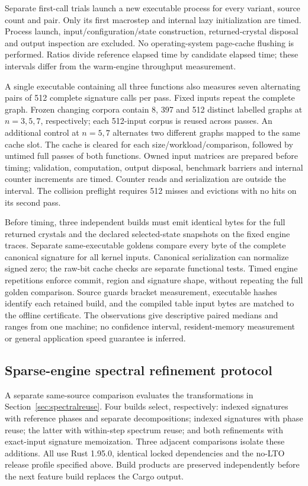 \documentclass[11pt,a4paper]{article}
\theoremstyle{definition}\newtheorem{definition}[theorem]{Definition}
\begin{document}
Separate first-call trials launch a new executable process for every variant, source count and pair. Only its first macrostep and internal lazy initialization are timed. Process launch, input/configuration/state construction, returned-crystal disposal and output inspection are excluded. No operating-system page-cache flushing is performed. Ratios divide reference elapsed time by candidate elapsed time; these intervals differ from the warm-engine throughput measurement.

A single executable containing all three functions also measures seven alternating pairs of 512 complete signature calls per pass. Fixed inputs repeat the complete graph. Frozen changing corpora contain 8, 397 and 512 distinct labelled graphs at $n=3,5,7$, respectively; each 512-input corpus is reused across passes. An additional control at $n=5,7$ alternates two different graphs mapped to the same cache slot. The cache is cleared for each size/workload/comparison, followed by untimed full passes of both functions. Owned input matrices are prepared before timing; validation, computation, output disposal, benchmark barriers and internal counter increments are timed. Counter reads and serialization are outside the interval. The collision preflight requires 512 misses and evictions with no hits on its second pass.

Before timing, three independent builds must emit identical bytes for the full returned crystals and the declared selected-state snapshots on the fixed engine traces. Separate same-executable goldens compare every byte of the complete canonical signature for all kernel inputs. Canonical serialization can normalize signed zero; the raw-bit cache checks are separate functional tests. Timed engine repetitions enforce commit, region and signature shape, without repeating the full golden comparison. Source guards bracket measurement, executable hashes identify each retained build, and the compiled table input bytes are matched to the offline certificate. The observations give descriptive paired medians and ranges from one machine; no confidence interval, resident-memory measurement or general application speed guarantee is inferred.



\subsection{Sparse-engine spectral refinement protocol}\label{sec:spectralphaseprotocol}
A separate same-source comparison evaluates the transformations in Section~\ref{sec:spectralreuse}. Four builds select, respectively: indexed signatures with reference phases and separate decompositions; indexed signatures with phase reuse; the latter with within-step spectrum reuse; and both refinements with exact-input signature memoization. Three adjacent comparisons isolate these additions. All use Rust 1.95.0, identical locked dependencies and the no-LTO release profile specified above. Build products are preserved independently before the next feature build replaces the Cargo output.
\end{document}
